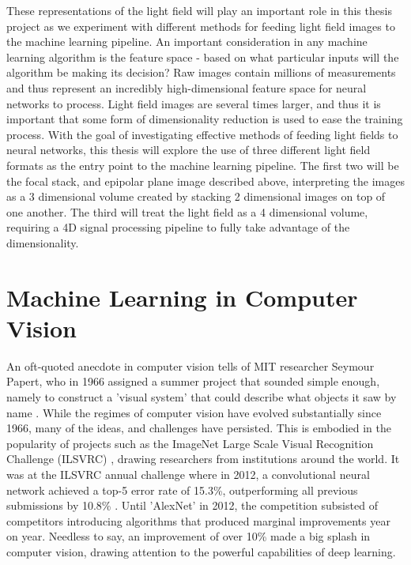 \documentclass[openany]{book}
\begin{document}
These representations of the light field will play an important role in this thesis project as we experiment with different methods for feeding light field images to the machine learning pipeline. An important consideration in any machine learning algorithm is the feature space - based on what particular inputs will the algorithm be making its decision? Raw images contain millions of measurements and thus represent an incredibly high-dimensional feature space for neural networks to process. Light field images are several times larger, and thus it is important that some form of dimensionality reduction is used to ease the training process. With the goal of investigating effective methods of feeding light fields to neural networks, this thesis will explore the use of three different light field formats as the entry point to the machine learning pipeline. The first two will be the focal stack, and epipolar plane image described above, interpreting the images as a 3 dimensional volume created by stacking 2 dimensional images on top of one another. The third will treat the light field as a 4 dimensional volume, requiring a 4D signal processing pipeline to fully take advantage of the dimensionality.

\section{Machine Learning in Computer Vision}


An oft-quoted anecdote in computer vision tells of MIT researcher Seymour Papert, who in 1966 assigned a summer project that sounded simple enough, namely to construct a 'visual system' that could describe what objects it saw by name \cite{papert1966vision}. While the regimes of computer vision have evolved substantially since 1966, many of the ideas, and challenges have persisted. This is embodied in the popularity of projects such as the ImageNet Large Scale Visual Recognition Challenge (ILSVRC) \cite{ilsvrc}, drawing researchers from institutions around the world. It was at the ILSVRC annual challenge where in 2012, a convolutional neural network achieved a top-5 error rate of 15.3\%, outperforming all previous submissions by 10.8\% \cite{krizhevsky2012alexnet}. Until 'AlexNet' in 2012, the competition subsisted of competitors introducing algorithms that produced marginal improvements year on year. Needless to say, an improvement of over 10\% made a big splash in computer vision, drawing attention to the powerful capabilities of deep learning.
\end{document}

